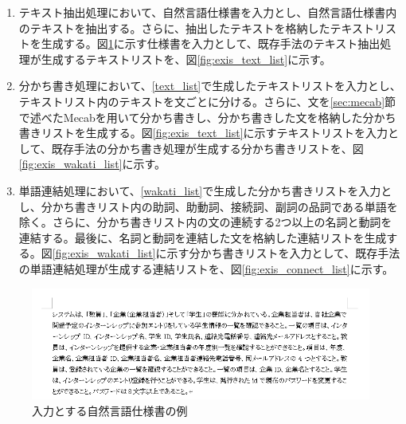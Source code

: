 \begin{enumerate}
    \item テキスト抽出処理において、自然言語仕様書を入力とし、自然言語仕様書内のテキストを抽出する。さらに、抽出したテキストを格納したテキストリストを生成する。図\ref{fig:exis_spec_example}に示す仕様書を入力として、既存手法のテキスト抽出処理が生成するテキストリストを、図\ref{fig:exis_text_list}に示す。
    \label{text_list}
    \item 分かち書き処理において、\ref{text_list}で生成したテキストリストを入力とし、テキストリスト内のテキストを文ごとに分ける。さらに、文を\ref{sec:mecab}節で述べたMecabを用いて分かち書きし、分かち書きした文を格納した分かち書きリストを生成する。図\ref{fig:exis_text_list}に示すテキストリストを入力として、既存手法の分かち書き処理が生成する分かち書きリストを、図\ref{fig:exis_wakati_list}に示す。
    \label{wakati_list}
    \item 単語連結処理において、\ref{wakati_list}で生成した分かち書きリストを入力とし、分かち書きリスト内の助詞、助動詞、接続詞、副詞の品詞である単語を除く。さらに、分かち書きリスト内の文の連続する2つ以上の名詞と動詞を連結する。最後に、名詞と動詞を連結した文を格納した連結リストを生成する。図\ref{fig:exis_wakati_list}に示す分かち書きリストを入力として、既存手法の単語連結処理が生成する連結リストを、図\ref{fig:exis_connect_list}に示す。
\end{enumerate}

\begin{figure}[tp]
    \begin{center}
        \includegraphics[width=1.0\columnwidth]{image/exis_spec_example.png}
        \caption{入力とする自然言語仕様書の例}
        \label{fig:exis_spec_example}
    \end{center}
\end{figure}

